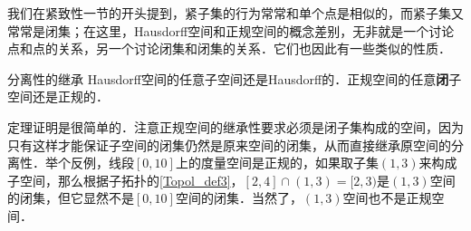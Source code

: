 我们在紧致性一节的开头提到，紧子集的行为常常和单个点是相似的，而紧子集又常常是闭集；在这里，Hausdorff空间和正规空间的概念差别，无非就是一个讨论点和点的关系，另一个讨论闭集和闭集的关系．它们也因此有一些类似的性质．

\begin{theorem}{分离性的继承}
Hausdorff空间的任意子空间还是Hausdorff的．正规空间的任意\textbf{闭}子空间还是正规的．
\end{theorem}

定理证明是很简单的．注意正规空间的继承性要求必须是闭子集构成的空间，因为只有这样才能保证子空间的闭集仍然是原来空间的闭集，从而直接继承原空间的分离性．举个反例，线段$[0,10]$上的度量空间是正规的，如果取子集$(1,3)$来构成子空间，那么根据子拓扑的\autoref{Topol_def3}，$[2,4]\cap(1,3)=[2,3)$是$(1,3)$空间的闭集，但它显然不是$[0,10]$空间的闭集．当然了，$(1,3)$空间也不是正规空间．